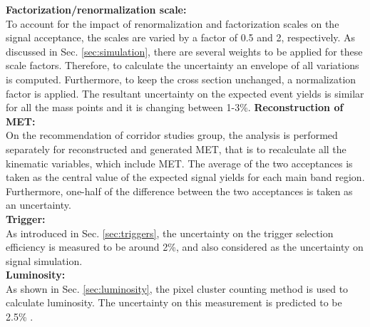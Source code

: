 \textbf{Factorization/renormalization scale:}\\
To account for the impact of renormalization and factorization scales on the signal acceptance, the scales are varied by a factor of 0.5 and 2, respectively. As discussed in Sec. \ref{sec:simulation}, there are several weights to be applied for these scale factors. Therefore, to calculate the uncertainty an envelope of all variations is computed. Furthermore, to keep the cross section unchanged, a normalization factor is applied. The resultant uncertainty on the expected event yields is similar for all the mass points and it is changing between 1-3\%.
\textbf{Reconstruction of MET:} \\
On the recommendation of corridor studies group, the analysis is performed separately for reconstructed and generated MET, that is to recalculate all the kinematic variables, which include MET.  The average of the two acceptances is taken as the central value of the expected signal yields for each main band region. Furthermore, one-half of the difference between the two acceptances is taken as an uncertainty.\\
\textbf{Trigger:}\\
As introduced in Sec. \ref{sec:triggers}, the uncertainty on the trigger selection efficiency is measured to be around 2\%, and also considered as the uncertainty on signal simulation. \\
\textbf{Luminosity:}\\
As shown in Sec. \ref{sec:luminosity},  the pixel cluster counting method \cite{lumi1} is used to calculate luminosity. The uncertainty on this measurement is predicted to be 2.5\% \cite{lumi2}.\\
